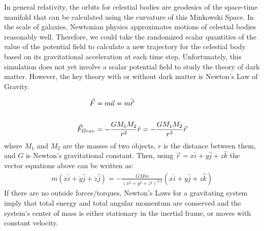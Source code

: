 \documentclass[11pt]{article}
\begin{document}
In general relativity, the orbits for celestial bodies are geodesics of the space-time manifold that can be calculated using the curvature of this Minkowski Space. In the scale of galaxies, Newtonian physics approximates motions of celestial bodies reasonably well. Therefore, we could take the randomized scalar quantities of the value of the potential field to calculate a new trajectory for the celestial body based on its gravitational acceleration at each time step. Unfortunately, this simulation does not yet involve a scalar potential field to study the theory of dark matter. However, the key theory with or without dark matter is Newton's Law of Gravity.

\begin{align}
    \vec{F}&=m\vec{a}=m\ddot{\vec{r}}\\[1\baselineskip]
    \vec{F}_{Grav} &= -\frac{GM_1M_2}{r^2}\hat{r}=-\frac{GM_1M_2}{r^3}\vec{r}
\end{align}
where $M_1$ and $M_2$ are the masses of two objects, $r$ is the distance between them, and $G$ is Newton's gravitational constant.
Then, using $\vec{r}=x\hat{i}+y\hat{j}+z\hat{k}$ the vector equations above can be written as:
\begin{align}
    m(\ddot{x}\hat{i}+\ddot{y}\hat{j}+\ddot{z}\hat{j})=-\frac{GMm}{(x^2+y^2+z^2)^{3/2}}(x\hat{i}+y\hat{j}+z\hat{k})
\end{align}
If there are no outside forces/torques, Newton’s Laws for a gravitating system imply that total energy and total angular momentum are conserved and the system's center of mass is either stationary in the inertial frame, or moves with
constant velocity.
\end{document}
